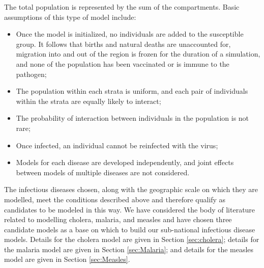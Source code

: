 \documentclass[letter,12pt, usenames,dvipsnames]{article}
\begin{document}
\noindent The total population is represented by the sum of the compartments.  Basic assumptions of this type of model include: 
\begin{itemize}
    \item Once the model is initialized, no individuals are added to the susceptible group.  It follows that births and natural deaths are unaccounted for, migration into and out of the region is frozen for the duration of a simulation, and none of the population has been vaccinated or is immune to the pathogen;
    \item The population within each strata is uniform, and each pair of individuals within the strata are equally likely to interact;
    \item The probability of interaction between individuals in the population is not rare;
    \item Once infected, an individual cannot be reinfected with the virus; 
	\item Models for each disease are developed independently, and joint effects between models of multiple diseases are not considered.
\end{itemize}

The infectious diseases chosen, along with the geographic scale on which they are modelled, meet the conditions described above and therefore qualify as candidates to be modeled in this way.  We have considered the body of literature related to modelling cholera, malaria, and measles and have chosen three candidate models as a base on which to build our sub-national infectious disease models.  Details for the cholera model are given in Section \ref{sec:cholera};  details for the malaria model are given in Section \ref{sec:Malaria}; and details for the measles model are given in Section \ref{sec:Measles}.
\end{document}
